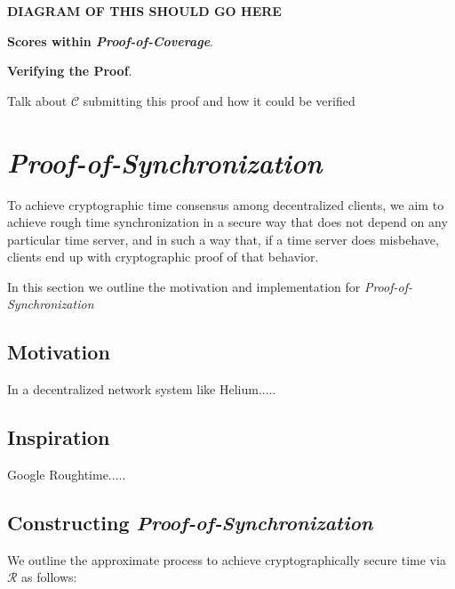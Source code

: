 \documentclass[letterpaper,11pt]{article}
\def\proofofcoverage/{\textit{Proof-of-Coverage}}
\begin{document}
\textbf{DIAGRAM OF THIS SHOULD GO HERE}\newline

\textbf{Scores within \proofofcoverage/}. \label{scores}





\textbf{Verifying the Proof}.\newline

Talk about $\mathcal{C}$ submitting this proof and how it could be verified

\section{\textit{Proof-of-Synchronization}} \label{roughtime}

To achieve cryptographic time consensus among decentralized clients, we aim to achieve rough time synchronization in a secure way that does not depend on any particular time server, and in such a way that, if a time server does misbehave, clients end up with cryptographic proof of that behavior. \newline

In this section we outline the motivation and implementation for \textit{Proof-of-Synchronization}

\subsection{Motivation}

In a decentralized network system like Helium.....

\subsection{Inspiration}

Google Roughtime.....

\subsection{Constructing \textit{Proof-of-Synchronization}}

We outline the approximate process to achieve cryptographically secure time via $\mathcal{R}$ as follows:\newline
\end{document}

